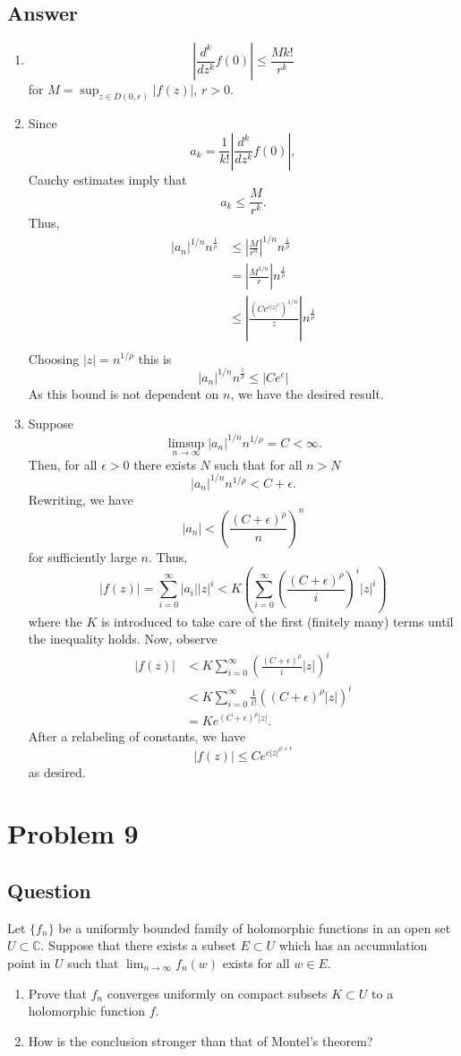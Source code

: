 \documentclass[11pt]{article}
\begin{document}
\subsection{Answer}
\begin{enumerate}
\item \[ \left|\frac{d^k}{dz^k} f(0)\right| \leq \frac{M k!}{r^k}\]
for $M = \sup_{z \in \overline{D}(0,r)} |f(z)|$, $r > 0$.
\item Since
\[a_k = \frac{1}{k!} \left| \frac{d^k}{dz^k} f(0) \right| ,\]
Cauchy estimates imply that
\[a_k \leq \frac{M}{r^k}.\]
Thus, 
\begin{align*}
|a_n|^{1/n} n^{\frac{1}{\rho}} &\leq \left| \frac{M}{r^n} \right|^{1/n} n^{\frac{1}{\rho}}    \\
&=  \left| \frac{M^{1/n}}{r} \right| n^{\frac{1}{\rho}}     \\
&\leq   \left| \frac{(Ce^{c|z|^\rho})^{1/n}}{z} \right| n^{\frac{1}{\rho}}     \\
\end{align*}
Choosing $|z| = n^{1/\rho}$ this is
\[ |a_n|^{1/n} n^{\frac{1}{\rho}} \leq  \left| Ce^c \right|  \]
As this bound is not dependent on $n$, we have the desired result.
\item Suppose
\[\limsup_{n \to \infty} |a_n|^{1/n} n ^{1/ \rho} = C < \infty.\]
Then, for all $\epsilon > 0$ there exists $N$ such that for all $n >N$
\[|a_n|^{1/n} n ^{1/\rho} < C + \epsilon.\]
Rewriting, we have
\[|a_n| < \left( \frac{(C+ \epsilon)^\rho}{n}\right)^n\]
for sufficiently large $n$. Thus, 
\[ |f(z)|  = \sum_{i=0}^\infty |a_i| |z|^i < K\left(\sum_{i=0}^\infty \left( \frac{(C+ \epsilon)^\rho}{i}\right)^i  |z|^i \right)\]
where the $K$ is introduced to take care of the first (finitely many) terms until the inequality holds. Now, observe
\begin{align*}
 |f(z)|  & < K\sum_{i=0}^\infty \left( \frac{(C+ \epsilon)^\rho}{i} |z|\right)^i  \\ 
&< K\sum_{i=0}^\infty  \frac{1}{i !}((C+ \epsilon)^\rho |z|)^i  \\
& = K e^{(C+ \epsilon)^\rho |z|}.
\end{align*}
After a relabeling of constants, we have 
\[|f(z) | \leq Ce^{c|z|^{\rho + \epsilon}}\]
as desired.
\end{enumerate}

\section{Problem 9}
\subsection{Question}
Let $\{ f_n\}$ be a uniformly bounded family of holomorphic functions in an open set $U \subset \mathbb{C}$. Suppose that there exists a subset $E \subset U$ which has an accumulation point in $U$ such that $\lim_{n \to \infty} f_n(w) $ exists for all $w \in E$.
\begin{enumerate}
\item Prove that $f_n$ converges uniformly on compact subsets $K \subset U$ to a holomorphic function $f$.
\item How is the conclusion stronger than that of Montel's theorem?
\end{enumerate}
\end{document}
